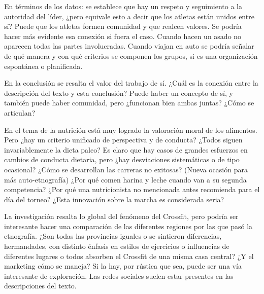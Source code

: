 En términos de los datos: se establece que hay un
respeto y seguimiento a la autoridad del líder,
¿pero equivale esto a decir que los atletas están unidos entre sí?
%
Puede que los atletas formen comunidad y que realcen valores.
Se podría hacer más evidente esa conexión si fuera el caso.
Cuando hacen un asado no aparecen todas las partes involucradas.
Cuando viajan en auto se podría señalar de qué manera y con qué criterios se componen los grupos, 
si es una organización espontánea o planificada.

En la conclusión se resalta el valor del trabajo de sí. ¿Cuál es la conexión entre la descripción del texto y esta conclusión?
Puede haber un concepto de sí, y también puede haber comunidad, pero ¿funcionan bien ambas juntas? ¿Cómo se articulan? 


En el tema de la nutrición está muy logrado la valoración moral de los alimentos. 
Pero ¿hay un criterio unificado de perspectiva y de conducta?
¿Todos siguen invariablemente la dieta paleo? 
Es claro que hay casos de grandes esfuerzos en cambios de conducta dietaria, pero
¿hay desviaciones sistemáticas o de tipo ocasional? 
¿Cómo se desarrollan las carreras no exitosas? (Nueva ocasión para más auto-etnografía)
¿Por qué comen harina y leche cuando van a su segunda competencia? 
¿Por qué una nutricionista no mencionada antes recomienda para el día del torneo? 
¿Esta innovación sobre la marcha es considerada seria?

La investigación resalta lo global del fenómeno del Crossfit,
pero podría ser interesante hacer una comparación de las diferentes regiones por las que pasó la etnografía.
¿Son todas las provincias iguales o se sintieron diferencias,
hermandades, con distinto énfasis en estilos de ejercicios o influencias
de diferentes lugares o todos absorben el Crossfit de una misma casa
central? ¿Y el marketing cómo se maneja?
Si la hay, por rústica que sea, puede ser una vía interesante de exploración.
Las redes sociales suelen
estar presentes en las descripciones del texto.
